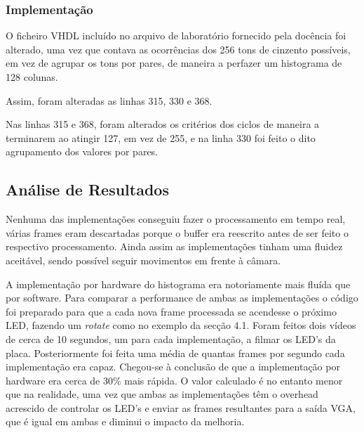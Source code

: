 \documentclass[a4paper,12pt]{article}
\begin{document}


\subsubsection{Implementação}

O ficheiro VHDL incluído no arquivo de laboratório fornecido pela docência foi alterado, uma vez que contava as ocorrências dos 256 tons de cinzento possíveis, em vez de agrupar os tons por pares, de maneira a perfazer um histograma de 128 colunas.

Assim, foram alteradas as linhas 315, 330 e 368.

Nas linhas 315 e 368, foram alterados os critérios dos ciclos de maneira a terminarem ao atingir 127, em vez de 255, e na linha 330 foi feito o dito agrupamento dos valores por pares.



\clearpage




\subsection{Análise de Resultados}
Nenhuma das implementações conseguiu fazer o processamento em tempo real, várias frames eram descartadas porque o buffer era reescrito antes de ser feito o respectivo processamento. Ainda assim as implementações tinham uma fluidez aceitável, sendo possível seguir movimentos em frente à câmara.

A implementação por hardware do histograma era notoriamente mais fluída que por software. Para comparar a performance de ambas as implementações o código foi preparado para que a cada nova frame processada se acendesse o próximo LED, fazendo um \textit{rotate} como no exemplo da secção 4.1. Foram feitos dois vídeos de cerca de 10 segundos, um para cada implementação, a filmar os LED's da placa. Posteriormente foi feita uma média de quantas frames por segundo cada implementação era capaz. Chegou-se à conclusão de que a implementação por hardware era cerca de 30\% mais rápida. O valor calculado é no entanto menor que na realidade, uma vez que ambas as implementações têm o overhead acrescido de controlar os LED's e enviar as frames resultantes para a saída VGA, que é igual em ambas e diminui o impacto da melhoria.
\end{document}
